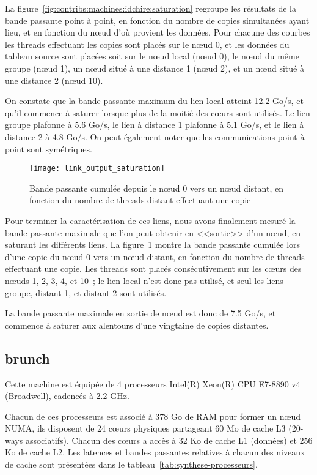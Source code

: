 La figure~\ref{fig:contribs:machines:idchire:saturation} regroupe les résultats de la bande passante point à point, en fonction du nombre de copies simultanées ayant lieu, et en fonction du nœud d'où provient les données.
Pour chacune des courbes les threads effectuant les copies sont placés sur le nœud 0, et les données du tableau source sont placées soit sur le nœud local (nœud 0), le nœud du même groupe (nœud 1), un nœud situé à une distance 1 (nœud 2), et un nœud situé à une distance 2 (nœud 10).

On constate que la bande passante maximum du lien local atteint 12.2 Go/s, et qu'il commence à saturer lorsque plus de la moitié des cœurs sont utilisés.
Le lien groupe plafonne à 5.6 Go/s, le lien à distance 1 plafonne à 5.1 Go/s, et le lien à distance 2 à 4.8 Go/s.
On peut également noter que les communications point à point sont symétriques.

\begin{figure}[ht]
  \centering
  \texttt{[image: link\_output\_saturation]}
  \caption{Bande passante cumulée depuis le nœud 0 vers un nœud distant, en fonction du nombre de threads distant effectuant une copie}\label{fig:contribs:machines:idchire:saturation-output}
\end{figure}

Pour terminer la caractérisation de ces liens, nous avons finalement mesuré la bande passante maximale que l'on peut obtenir en <<sortie>> d'un nœud, en saturant les différents liens.
La figure~\ref{fig:contribs:machines:idchire:saturation-output} montre la bande passante cumulée lors d'une copie du nœud 0 vers un nœud distant, en fonction du nombre de threads effectuant une copie.
Les threads sont placés consécutivement sur les cœurs des nœuds 1, 2, 3, 4, et 10~; le lien local n'est donc pas utilisé, et seul les liens groupe, distant 1, et distant 2 sont utilisés.

La bande passante maximale en sortie de nœud est donc de 7.5 Go/s, et commence à saturer aux alentours d'une vingtaine de copies distantes.


\subsection{brunch}\label{sec:contribs:machines:brunch}

Cette machine est équipée de 4 processeurs Intel(R) Xeon(R) CPU E7-8890 v4 (Broadwell), cadencés à 2.2 GHz.

Chacun de ces processeurs est associé à 378 Go de RAM pour former un nœud NUMA, ils disposent de 24 cœurs physiques partageant 60 Mo de cache L3 (20-ways associatifs).
Chacun des cœurs a accès à 32 Ko de cache L1 (données) et 256 Ko de cache L2.
Les latences et bandes passantes relatives à chacun des niveaux de cache sont présentées dans le tableau~\ref{tab:synthese-processeurs}.

